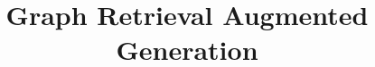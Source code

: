 \documentclass[xcolor=dvipsnames,compress,t,pdf,9pt]{beamer}
\title[\insertframenumber /\inserttotalframenumber]{Graph Retrieval Augmented Generation}
\begin{document}
	\begin{frame}
	\titlepage
	\end{frame}
	

	
	
	
\end{document}
